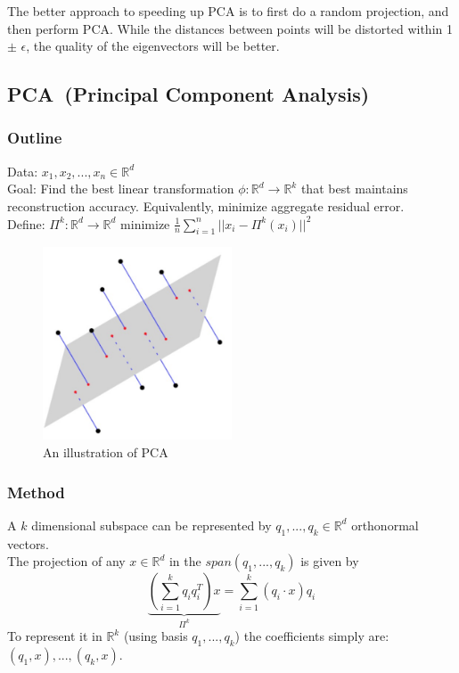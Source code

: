 The better approach to speeding up PCA is to first do a random
projection, and then perform PCA. While the distances between points
will be distorted within 1 $\pm$ $\epsilon$, the quality of the
eigenvectors will be better.  


\subsection{PCA~(Principal Component Analysis)}
\subsubsection{Outline}
Data: $x_1,x_2,...,x_n \in \mathbb{R}^d$\\

\noindent Goal: Find the best linear transformation $\phi:
\mathbb{R}^d \rightarrow \mathbb{R}^k$ that best maintains
reconstruction accuracy. Equivalently, minimize aggregate residual
error.\\ 

\noindent Define: $\Pi^k: \mathbb{R}^d \rightarrow \mathbb{R}^d$
minimize $\frac{1}{n} \sum_{i=1}^n ||x_i - \Pi^k (x_i)||^2$\\

\begin{figure}[h!]
\begin{center}
\includegraphics[width=0.5\textwidth]{chapter_6/files/projections.jpg}
\caption{An illustration of PCA}
\end{center}
\end{figure}
\subsubsection{Method}

A $k$ dimensional subspace can be represented by $q_1,...,q_k \in
\mathbb{R}^d$ orthonormal vectors.\\ 
The projection of any $x\in \mathbb{R}^d$ in the $span(q_1,...,q_k)$
is given by 
\[
\underbrace{(\sum_{i=1}^k q_i q_i^T)x}_{\Pi^k} = \sum_{i=1}^k
(q_i\cdot x)q_i 
\]
To represent it in $\mathbb{R}^k$ (using basis $q_1,...,q_k$) the
coefficients simply are: $(q_1,x),...,(q_k,x)$.\\ 
